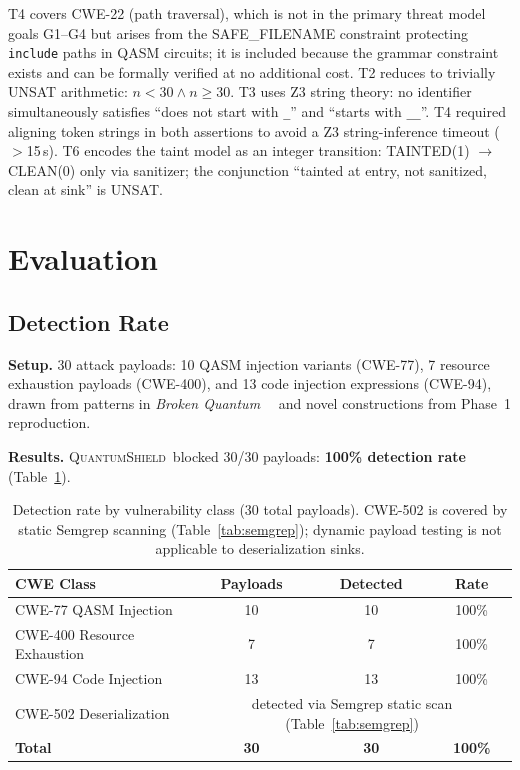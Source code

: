 \documentclass[conference,compsoc]{IEEEtran}
\newcommand{\tool}{\textsc{QuantumShield}}
\newcommand{\broken}{\textit{Broken Quantum}~\cite{blain2026broken}}
\begin{document}
\noindent
T4 covers CWE-22 (path traversal), which is not in the primary
threat model goals G1--G4 but arises from the SAFE\_FILENAME
constraint protecting \texttt{include} paths in QASM circuits;
it is included because the grammar constraint exists and can be
formally verified at no additional cost.
T2 reduces to trivially UNSAT arithmetic: $n\!<\!30 \wedge n\!\geq\!30$.
T3 uses Z3 string theory: no identifier simultaneously satisfies
``does not start with \texttt{\_}'' and ``starts with \texttt{\_\_}''.
T4 required aligning token strings in both assertions to avoid a Z3
string-inference timeout ($>$15\,s).
T6 encodes the taint model as an integer transition: TAINTED(1)
$\to$ CLEAN(0) only via sanitizer; the conjunction ``tainted at entry,
not sanitized, clean at sink'' is UNSAT.

\FloatBarrier
\section{Evaluation}
\label{sec:eval}
\subsection{Detection Rate}
\noindent \textbf{Setup.}
30 attack payloads: 10 QASM injection variants (CWE-77), 7 resource
exhaustion payloads (CWE-400), and 13 code injection expressions
(CWE-94), drawn from patterns in \broken~\cite{blain2026broken} and
novel constructions from Phase~1 reproduction.

\noindent \textbf{Results.}
\tool\ blocked 30/30 payloads: \textbf{100\% detection rate}
(Table~\ref{tab:detection}).

\begin{table}[!ht]
\centering
\caption{Detection rate by vulnerability class (30 total payloads).
  CWE-502 is covered by static Semgrep scanning (Table~\ref{tab:semgrep});
  dynamic payload testing is not applicable to deserialization sinks.}
\label{tab:detection}
\begin{tabular}{lccc}
\toprule
CWE Class & Payloads & Detected & Rate \\
\midrule
CWE-77 QASM Injection       & 10 & 10 & 100\% \\
CWE-400 Resource Exhaustion &  7 &  7 & 100\% \\
CWE-94 Code Injection       & 13 & 13 & 100\% \\
CWE-502 Deserialization     & \multicolumn{3}{c}{detected via Semgrep static scan (Table~\ref{tab:semgrep})} \\
\midrule
\textbf{Total} & \textbf{30} & \textbf{30} & \textbf{100\%} \\
\bottomrule
\end{tabular}
\end{table}
\end{document}
